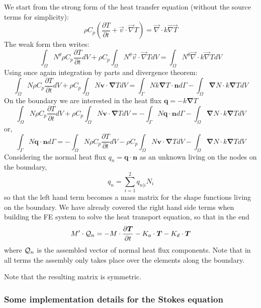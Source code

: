 We start from the strong form of the heat transfer equation (without the source terms for simplicity):
\[
\rho C_p
\left(\frac{\partial T}{\partial t} + \vec{v}\cdot \vec{\nabla}T\right)
=
\vec{\nabla} \cdot k\vec{\nabla T}
\]
The weak form then writes:
\[
\int_\Omega N^\theta
\rho C_p
\frac{\partial T}{\partial t} dV 
+
\rho C_p
\int_\Omega N^\theta
\vec{v}\cdot \vec{\nabla}T  dV
=
\int_\Omega N^\theta
\vec{\nabla} \cdot k\vec{\nabla} T dV
\]
Using once again integration by parts and divergence theorem:
\[
\int_\Omega N
\rho C_p
\frac{\partial T}{\partial t} dV 
+
\rho C_p
\int_\Omega N
 {\bm v}\cdot {\bm \nabla}T  dV
=
\int_\Gamma N k {\bm \nabla T} \cdot {\bm n} d\Gamma
-
\int_\Omega  {\bm \nabla} N \cdot k{\bm \nabla T} dV
\]
On the boundary we are interested in the heat flux ${\bm q}=-k {\bm \nabla T}$
\[
\int_\Omega N
\rho C_p
\frac{\partial T}{\partial t} dV 
+
\rho C_p
\int_\Omega N
 {\bm v}\cdot {\bm \nabla}T  dV
=
-\int_\Gamma N {\bm q} \cdot {\bm n} d\Gamma
- \int_\Omega  {\bm \nabla} N \cdot k{\bm \nabla T} dV
\]
or,
\[
\int_\Gamma N {\bm q} \cdot {\bm n} d\Gamma
=
-\int_\Omega N
\rho C_p
\frac{\partial T}{\partial t} dV 
-\rho C_p
\int_\Omega N
 {\bm v}\cdot {\bm \nabla}T  dV
- \int_\Omega  {\bm \nabla} N \cdot k{\bm \nabla T} dV
\]
Considering the normal heat flux $q_n = {\bm q} \cdot {\bm n}$ as an unknown 
living on the nodes on the boundary, 
\[
q_n = \sum_{i=1}^2 q_{n|i} N_i
\]
so that the left hand term becomes a mass matrix for the shape functions living on 
the boundary.
We have already covered the right hand side terms when building the FE system 
to solve the heat transport equation, so that in the end 
\[
M' \cdot {\cal Q}_n =
- M \cdot \frac{\partial \bm T}{\partial t} -K_a \cdot {\bm T} - K_d \cdot {\bm T} 
\]
where ${\cal Q}_n$ is the assembled vector of normal heat flux components.
Note that in all terms the assembly only takes place over the elements along the boundary.


Note that the resulting matrix is symmetric.


\subsubsection{Some implementation details for the Stokes equation}

